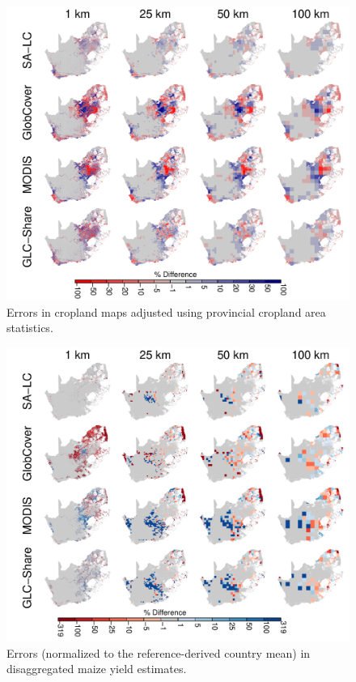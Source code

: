 \documentclass[12pt, titlepage]{article}
\begin{document}
\begin{figure}[ht]
  \centering
     \includegraphics[width = 12cm]{figures/cropland_adj_bias_map2.pdf} 
      \caption{Errors in cropland maps adjusted using provincial cropland area statistics.}
      \label{fig:cropadjbias}
\end{figure}

\FloatBarrier


\clearpage
\begin{figure}[ht]
  \centering
     \includegraphics[width = 12cm]{figures/yld_bias_map.pdf} 
      \caption{Errors (normalized to the reference-derived country mean) in disaggregated maize yield estimates.}
      \label{fig:yld}
\end{figure}
\end{document}
